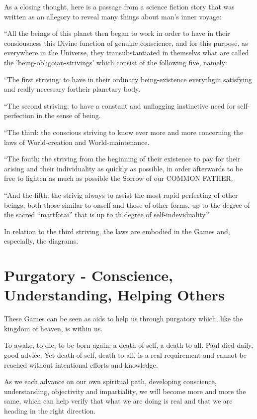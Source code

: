 \documentclass[12pt,letterpaper]{book}
\begin{document}
As a closing thought, here is a passage from a science fiction story that was written as an allegory to reveal many things about man's inner voyage:

``All the beings of this planet then began to work in order to have in their consiousness this Divine function of genuine conscience, and for this purpose, as everywhere in the Universe, they transubstantiated in themselvs what are called the 'being-obligoian-strivings' which consist of the following five, namely:

``The first striving: to have in their ordinary being-existence everythgin satisfying and really necessary fortheir planetary body.

``The second striving: to have a constant and unflagging instinctive need for self-perfection in the sense of being.

``The third: the conscious striving to know ever more and more concerning the laws of World-creation and World-maintenance.

``The fouth: the striving from the beginning of their existence to pay for their arising and their individuality as quickly as possible, in order afterwards to be free to lighten as much as possible the Sorrow of our COMMON FATHER.

``And the fifth: the strivig always to assist the most rapid perfecting of other beings, both those similar to onself and those of other forms, up to the degree of the sacred ``martfotai'' that is up to th degree of self-indeviduality.''

In relation to the third striving, the laws are embodied in the Games and, especially, the diagrams.

\chapter{Purgatory - Conscience, Understanding, Helping Others}

These Games can be seen as aids to help us through purgatory which, like the kingdom of heaven, is within us.


To awake, to die, to be born again; a death of self, a death to all. Paul died daily, good advice. Yet death of self, death to all, is a real requirement and cannot be reached without intentional efforts and knowledge.

As we each advance on our own spiritual path, developing conscience, understanding, objectivity and impartiality, we will become more and more the same, which can help verify that what we are doing is real and that we are heading in the right direction.
\end{document}

